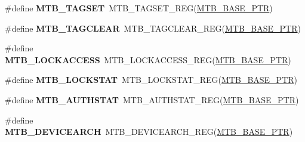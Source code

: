 \begin{DoxyCompactItemize}
\item 
\mbox{\label{group___m_t_b___register___accessor___macros_gaddf096e99a94797b17c244a2edbe0a75}} 
\#define {\bfseries M\+T\+B\+\_\+\+T\+A\+G\+S\+ET}~M\+T\+B\+\_\+\+T\+A\+G\+S\+E\+T\+\_\+\+R\+EG(\hyperlink{group___m_t_b___peripheral_gadf7f362dfa67354951e6a23ddf08cd73}{M\+T\+B\+\_\+\+B\+A\+S\+E\+\_\+\+P\+TR})
\item 
\mbox{\label{group___m_t_b___register___accessor___macros_gaf7137f4ceb5b43345e4ba212ecf2e6f0}} 
\#define {\bfseries M\+T\+B\+\_\+\+T\+A\+G\+C\+L\+E\+AR}~M\+T\+B\+\_\+\+T\+A\+G\+C\+L\+E\+A\+R\+\_\+\+R\+EG(\hyperlink{group___m_t_b___peripheral_gadf7f362dfa67354951e6a23ddf08cd73}{M\+T\+B\+\_\+\+B\+A\+S\+E\+\_\+\+P\+TR})
\item 
\mbox{\label{group___m_t_b___register___accessor___macros_ga78ad97fdc6b5752cf1a30731a0f8585b}} 
\#define {\bfseries M\+T\+B\+\_\+\+L\+O\+C\+K\+A\+C\+C\+E\+SS}~M\+T\+B\+\_\+\+L\+O\+C\+K\+A\+C\+C\+E\+S\+S\+\_\+\+R\+EG(\hyperlink{group___m_t_b___peripheral_gadf7f362dfa67354951e6a23ddf08cd73}{M\+T\+B\+\_\+\+B\+A\+S\+E\+\_\+\+P\+TR})
\item 
\mbox{\label{group___m_t_b___register___accessor___macros_gaebecb4529453581f85d19cacab9c0508}} 
\#define {\bfseries M\+T\+B\+\_\+\+L\+O\+C\+K\+S\+T\+AT}~M\+T\+B\+\_\+\+L\+O\+C\+K\+S\+T\+A\+T\+\_\+\+R\+EG(\hyperlink{group___m_t_b___peripheral_gadf7f362dfa67354951e6a23ddf08cd73}{M\+T\+B\+\_\+\+B\+A\+S\+E\+\_\+\+P\+TR})
\item 
\mbox{\label{group___m_t_b___register___accessor___macros_gaf3db7626003fd4b420efaf3c34278d76}} 
\#define {\bfseries M\+T\+B\+\_\+\+A\+U\+T\+H\+S\+T\+AT}~M\+T\+B\+\_\+\+A\+U\+T\+H\+S\+T\+A\+T\+\_\+\+R\+EG(\hyperlink{group___m_t_b___peripheral_gadf7f362dfa67354951e6a23ddf08cd73}{M\+T\+B\+\_\+\+B\+A\+S\+E\+\_\+\+P\+TR})
\item 
\mbox{\label{group___m_t_b___register___accessor___macros_ga1335969fc1d5c066fb8d087c6851fb5e}} 
\#define {\bfseries M\+T\+B\+\_\+\+D\+E\+V\+I\+C\+E\+A\+R\+CH}~M\+T\+B\+\_\+\+D\+E\+V\+I\+C\+E\+A\+R\+C\+H\+\_\+\+R\+EG(\hyperlink{group___m_t_b___peripheral_gadf7f362dfa67354951e6a23ddf08cd73}{M\+T\+B\+\_\+\+B\+A\+S\+E\+\_\+\+P\+TR})

\end{DoxyCompactItemize}
